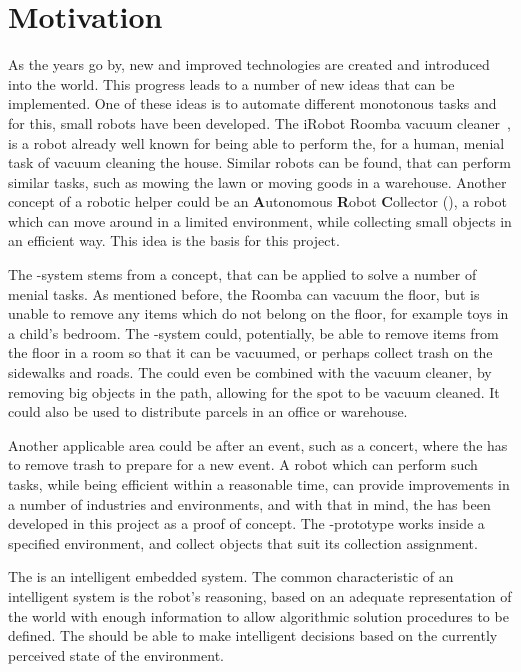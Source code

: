 \section{Motivation} \label{sec:motivation}
As the years go by, new and improved technologies are created and introduced into the world. This progress leads to a number of new ideas that can be implemented. One of these ideas is to automate different monotonous tasks and for this, small robots have been developed. The iRobot Roomba vacuum cleaner~\citep{roomba}, is a robot already well known for being able to perform the, for a human, menial task of vacuum cleaning the house. Similar robots can be found, that can perform similar tasks, such as mowing the lawn or moving goods in a warehouse. Another concept of a robotic helper could be an \textbf{A}utonomous \textbf{R}obot \textbf{C}ollector (\projname{}), a robot which can move around in a limited environment, while collecting small objects in an efficient way. This idea is the basis for this project.

The \projname{}-system stems from a concept, that can be applied to solve a number of menial tasks. As mentioned before, the Roomba can vacuum the floor, but is unable to remove any items which do not belong on the floor, for example toys in a child's bedroom. The \projname{}-system could, potentially, be able to remove items from the floor in a room so that it can be vacuumed, or perhaps collect trash on the sidewalks and roads. The \projname{} could even be combined with the vacuum cleaner, by removing big objects in the path, allowing for the spot to be vacuum cleaned. It could also be used to distribute parcels in an office or warehouse.

Another applicable area could be after an event, such as a concert, where the \projname{} has to remove trash to prepare for a new event. A robot which can perform such tasks, while being efficient within a reasonable time, can provide improvements in a number of industries and environments, and with that in mind, the \projname{} has been developed in this project as a proof of concept. The \projname{}-prototype works inside a specified environment, and collect objects that suit its collection assignment. 

The \projname{} is an intelligent embedded system. The common characteristic of an intelligent system is the robot's reasoning, based on an adequate representation of the world with enough information to allow algorithmic solution procedures to be defined. The \projname{} should be able to make intelligent decisions based on the currently perceived state of the environment.

